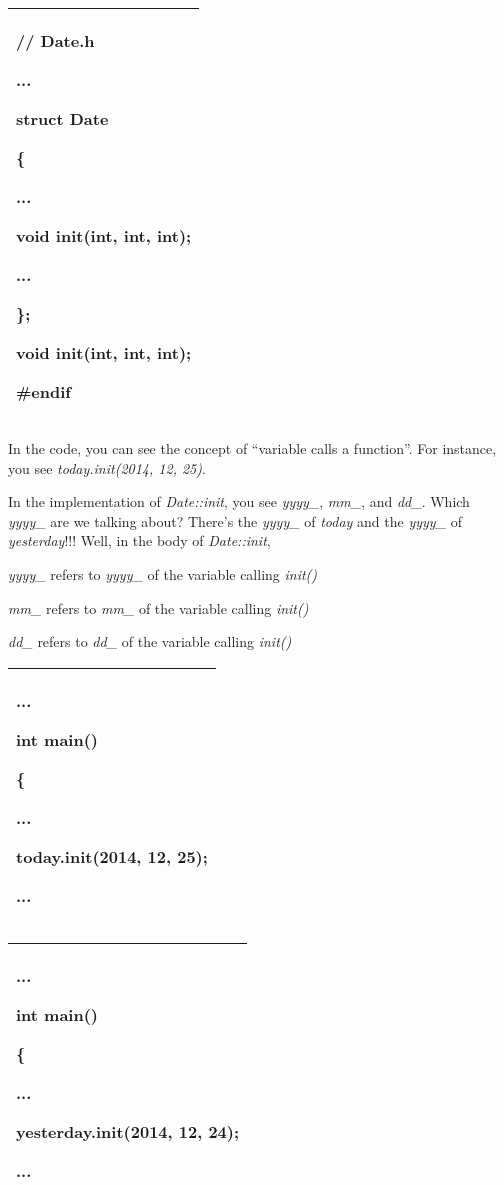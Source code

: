 \documentclass[
]{article}
\begin{document}
\begin{longtable}[]{@{}l@{}}
\toprule
\endhead
\begin{minipage}[t]{0.97\columnwidth}\raggedright
// Date.h

...

struct Date

\{

...

void init(int, int, int);

...

\};

void init(int, int, int);

\#endif\strut
\end{minipage}\tabularnewline
\bottomrule
\end{longtable}

In the code, you can see the concept of ``variable calls a function''.
For instance, you see \emph{today.init(2014, 12, 25)}.

In the implementation of \emph{Date::init}, you see \emph{yyyy\_},
\emph{mm\_}, and \emph{dd\_}. Which \emph{yyyy\_} are we talking about?
There's the \emph{yyyy\_} of \emph{today} and the \emph{yyyy\_} of
\emph{yesterday}!!! Well, in the body of \emph{Date::init},

\emph{yyyy\_} refers to \emph{yyyy\_} of the variable calling
\emph{init()}

\emph{mm\_} refers to \emph{mm\_} of the variable calling \emph{init()}

\emph{dd\_} refers to \emph{dd\_} of the variable calling \emph{init()}

\begin{longtable}[]{@{}l@{}}
\toprule
\endhead
\begin{minipage}[t]{0.97\columnwidth}\raggedright
...

int main()

\{

...

\textbf{today.init(2014, 12, 25);}

...\strut
\end{minipage}\tabularnewline
\bottomrule
\end{longtable}

\begin{longtable}[]{@{}l@{}}
\toprule
\endhead
\begin{minipage}[t]{0.97\columnwidth}\raggedright
...

int main()

\{

...

\textbf{yesterday.init(2014, 12, 24);}

...\strut
\end{minipage}\tabularnewline
\bottomrule
\end{longtable}
\end{document}
